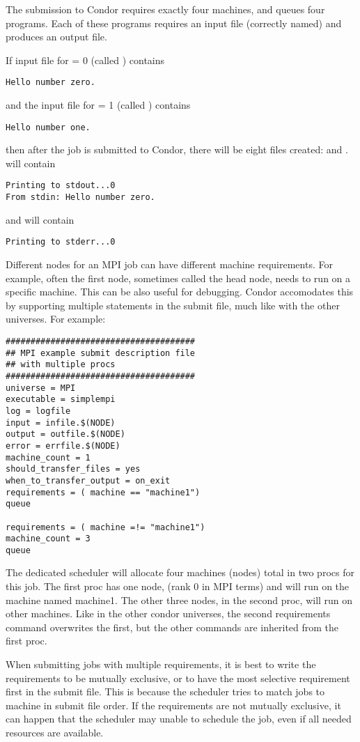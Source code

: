 The submission to Condor requires exactly four machines,
and queues four programs.
Each of these programs requires an input file (correctly
named) and produces an output file.

If input file for  = 0 (called ) contains
\begin{verbatim}
Hello number zero.
\end{verbatim}
and
the input file for  = 1 (called ) contains
\begin{verbatim}
Hello number one.
\end{verbatim}
then after the job is submitted to Condor,
there will be 
eight files created:  
 and .
 will contain
\begin{verbatim}
Printing to stdout...0
From stdin: Hello number zero.
\end{verbatim}
and  will contain
\begin{verbatim}
Printing to stderr...0
\end{verbatim}

Different nodes for an MPI job can have different machine requirements.
For example, often the first node, sometimes called the head node, needs
to run on a specific machine.  This can be also useful for debugging.
Condor accomodates this by supporting 
multiple  statements in the submit file, much like with
the other universes.  For example:

\begin{verbatim}
######################################
## MPI example submit description file
## with multiple procs
######################################
universe = MPI
executable = simplempi
log = logfile
input = infile.$(NODE)
output = outfile.$(NODE)
error = errfile.$(NODE)
machine_count = 1
should_transfer_files = yes
when_to_transfer_output = on_exit
requirements = ( machine == "machine1")
queue

requirements = ( machine =!= "machine1")
machine_count = 3
queue
\end{verbatim}

The dedicated scheduler will allocate four machines (nodes) total in 
two procs for this job.  The first proc has one node, (rank 0 
in MPI terms) and will run on the machine named machine1.  The 
other three nodes, in the second proc, will run on other machines.  
Like in the other condor universes, the second requirements command 
overwrites the first, but the other commands are inherited from the 
first proc.

When submitting jobs with multiple requirements, it is
best to write the requirements to be mutually exclusive,
or to have the most selective requirement first in the submit file.
This is because the scheduler tries to match jobs to machine in
submit file order.  If the requirements are not mutually exclusive,
it can happen that the scheduler may unable to schedule the job, even
if all needed resources are available.
